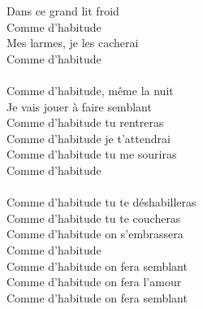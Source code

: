 Dans ce grand lit froid\\
Comme d'habitude\\
Mes larmes, je les cacherai\\
Comme d'habitude\\\\
Comme d'habitude, même la nuit\\
Je vais jouer à faire semblant\\
Comme d'habitude tu rentreras\\
Comme d'habitude je t'attendrai\\
Comme d'habitude tu me souriras\\
Comme d'habitude\\\\
Comme d'habitude tu te déshabilleras\\
Comme d'habitude tu te coucheras\\
Comme d'habitude on s'embrassera\\
Comme d'habitude\\
Comme d'habitude on fera semblant\\
Comme d'habitude on fera l'amour\\
Comme d'habitude on fera semblant\\
